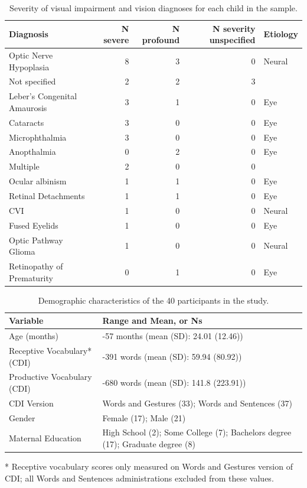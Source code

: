 \documentclass[english,man,floatsintext]{apa6}
\begin{document}
\begin{table}[H]

\caption{\label{tab:diagnosis-table}Severity of visual impairment and vision diagnoses for each child in the sample.}
\centering
\begin{tabular}[t]{l|r|r|r|l}
\hline
Diagnosis & N severe & N profound & N severity unspecified & Etiology\\
\hline
Optic Nerve Hypoplasia & 8 & 3 & 0 & Neural\\
\hline
Not specified & 2 & 2 & 3 & \\
\hline
Leber's Congenital Amaurosis & 3 & 1 & 0 & Eye\\
\hline
Cataracts & 3 & 0 & 0 & Eye\\
\hline
Microphthalmia & 3 & 0 & 0 & Eye\\
\hline
Anopthalmia & 0 & 2 & 0 & Eye\\
\hline
Multiple & 2 & 0 & 0 & \\
\hline
Ocular albinism & 1 & 1 & 0 & Eye\\
\hline
Retinal Detachments & 1 & 1 & 0 & Eye\\
\hline
CVI & 1 & 0 & 0 & Neural\\
\hline
Fused Eyelids & 1 & 0 & 0 & Eye\\
\hline
Optic Pathway Glioma & 1 & 0 & 0 & Neural\\
\hline
Retinopathy of Prematurity & 0 & 1 & 0 & Eye\\
\hline
\end{tabular}
\end{table}

\begin{table}[H]

\begin{threeparttable}
\caption{\label{tab:demographics-table}Demographic characteristics of the 40 participants in the study.}
\centering
\begin{tabular}[t]{l|>{\raggedright\arraybackslash}p{4in}}
\hline
Variable & Range and Mean, or Ns\\
\hline
Age (months) & 7-57 months (mean (SD): 24.01 (12.46))\\
\hline
Receptive Vocabulary* (CDI) & 0-391 words (mean (SD): 59.94 (80.92))\\
\hline
Productive Vocabulary (CDI) & 0-680 words (mean (SD): 141.8 (223.91))\\
\hline
CDI Version & Words and Gestures (33); Words and Sentences (37)\\
\hline
Gender & Female (17); Male (21)\\
\hline
Maternal Education & High School (2); Some College (7); Bachelors degree (17); Graduate degree (8)\\
\hline
\end{tabular}
\begin{tablenotes}
\small
\item [*] Receptive vocabulary scores only measured on Words and Gestures version of CDI; all Words and Sentences administrations excluded from these values.
\end{tablenotes}
\end{threeparttable}
\end{table}
\end{document}

